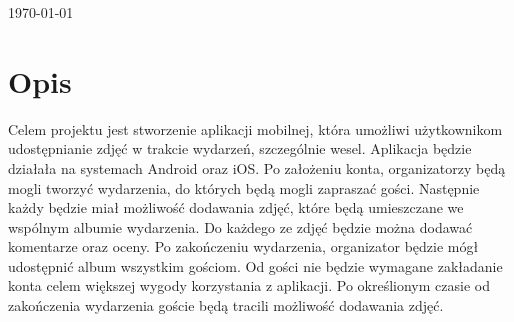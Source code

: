 \begin{titlepage}




    \vfill\vfill\vfill %

    {\large\today} %

    \vfill %

\end{titlepage}

\newpage

\section*{Opis}
Celem projektu jest stworzenie aplikacji mobilnej, która umożliwi użytkownikom udostępnianie zdjęć w trakcie wydarzeń, szczególnie wesel. Aplikacja będzie działała na systemach Android oraz iOS. Po założeniu konta, organizatorzy będą mogli tworzyć wydarzenia, do których będą mogli zapraszać gości. Następnie każdy będzie miał możliwość dodawania zdjęć, które będą umieszczane we wspólnym albumie wydarzenia. Do każdego ze zdjęć będzie można dodawać komentarze oraz oceny. Po zakończeniu wydarzenia, organizator będzie mógł udostępnić album wszystkim gościom. Od gości nie będzie wymagane zakładanie konta celem większej wygody korzystania z aplikacji. Po określionym czasie od zakończenia wydarzenia goście będą tracili możliwość dodawania zdjęć.

